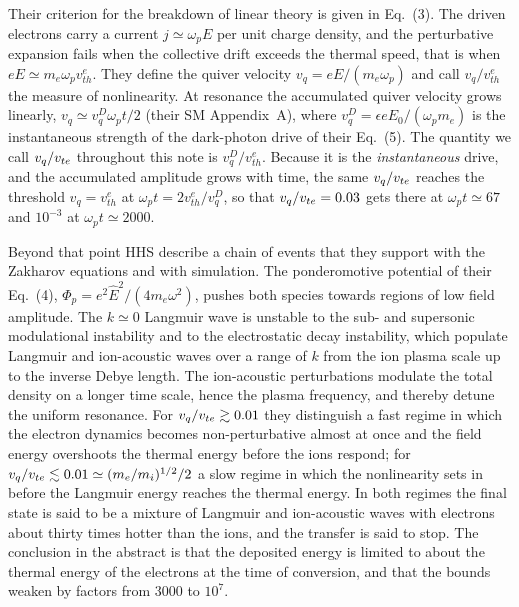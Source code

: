 Their criterion for the breakdown of linear theory is given in Eq.~(3). The driven electrons carry a current $j\simeq\omega_pE$ per unit charge density, and the perturbative expansion fails when the collective drift exceeds the thermal speed, that is when $eE\simeq m_e\omega_pv_{th}^e$. They define the quiver velocity $v_q=eE/(m_e\omega_p)$ and call $v_q/v_{th}^e$ the measure of nonlinearity. At resonance the accumulated quiver velocity grows linearly, $v_q\simeq v_q^D\omega_pt/2$ (their SM Appendix~A), where $v_q^D=\epsilon eE_0/(\omega_pm_e)$ is the instantaneous strength of the dark-photon drive of their Eq.~(5). The quantity we call $v_q/v_{te}$ throughout this note is $v_q^D/v_{th}^e$. Because it is the \emph{instantaneous} drive, and the accumulated amplitude grows with time, the same $v_q/v_{te}$ reaches the threshold $v_q=v_{th}^e$ at $\omega_pt=2v_{th}^e/v_q^D$, so that $v_q/v_{te}=0.03$ gets there at $\omega_pt\simeq67$ and $10^{-3}$ at $\omega_pt\simeq 2000$.

Beyond that point HHS describe a chain of events that they support with the Zakharov equations and with simulation. The ponderomotive potential of their Eq.~(4), $\Phi_p=e^2\hat E^2/(4m_e\omega^2)$, pushes both species towards regions of low field amplitude. The $k\simeq0$ Langmuir wave is unstable to the sub- and supersonic modulational instability and to the electrostatic decay instability, which populate Langmuir and ion-acoustic waves over a range of $k$ from the ion plasma scale up to the inverse Debye length. The ion-acoustic perturbations modulate the total density on a longer time scale, hence the plasma frequency, and thereby detune the uniform resonance. For $v_q/v_{te}\gtrsim0.01$ they distinguish a fast regime in which the electron dynamics becomes non-perturbative almost at once and the field energy overshoots the thermal energy before the ions respond; for $v_q/v_{te}\lesssim0.01\simeq(m_e/m_i)^{1/2}/2$ a slow regime in which the nonlinearity sets in before the Langmuir energy reaches the thermal energy. In both regimes the final state is said to be a mixture of Langmuir and ion-acoustic waves with electrons about thirty times hotter than the ions, and the transfer is said to stop. The conclusion in the abstract is that the deposited energy is limited to about the thermal energy of the electrons at the time of conversion, and that the bounds weaken by factors from $3000$ to $10^{7}$.

